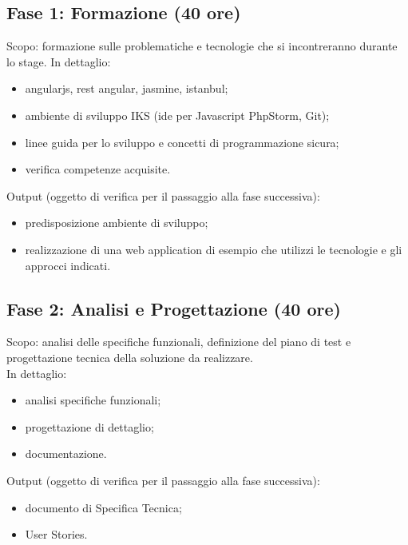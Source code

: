 \subsection{Fase 1: Formazione (40 ore)}
Scopo: formazione sulle problematiche e tecnologie che si incontreranno durante lo stage.
In dettaglio:
\begin{itemize}
	\item angularjs, rest angular, jasmine, istanbul;
	\item ambiente di sviluppo IKS (\gls{ide} per Javascript PhpStorm, Git);
	\item linee guida per lo sviluppo e concetti di programmazione sicura;
	\item verifica competenze acquisite.
\end{itemize}
Output (oggetto di verifica per il passaggio alla fase successiva):
\begin{itemize}
	\item predisposizione ambiente di sviluppo;
	\item realizzazione di una web application di esempio che utilizzi le tecnologie e gli approcci
indicati.
\end{itemize}

\subsection{Fase 2: Analisi e Progettazione (40 ore)}
Scopo: analisi delle specifiche funzionali, definizione del piano di test e progettazione tecnica
della soluzione da realizzare.\\
In dettaglio:
\begin{itemize}
	\item analisi specifiche funzionali;
	\item progettazione di dettaglio;
	\item documentazione.
\end{itemize}
Output (oggetto di verifica per il passaggio alla fase successiva):
\begin{itemize}
	\item documento di Specifica Tecnica;
	\item User Stories.
\end{itemize}

